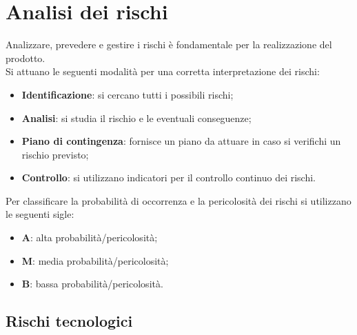 \section{Analisi dei rischi}
Analizzare, prevedere e gestire i rischi è fondamentale per la realizzazione del prodotto. \\
Si attuano le seguenti modalità per una corretta interpretazione dei rischi:
\begin{itemize}
    \item \textbf{Identificazione}: si cercano tutti i possibili rischi;
    \item \textbf{Analisi}: si studia il rischio e le eventuali conseguenze;
    \item \textbf{Piano di contingenza}: fornisce un piano da attuare in caso si verifichi un rischio previsto;
    \item \textbf{Controllo}: si utilizzano indicatori per il controllo continuo dei rischi.
\end{itemize}
\noindent
Per classificare la probabilità di occorrenza e la pericolosità dei rischi si utilizzano le seguenti sigle:
\begin{itemize}
    \item \textbf{A}: alta probabilità/pericolosità;
    \item \textbf{M}: media probabilità/pericolosità;
    \item \textbf{B}: bassa probabilità/pericolosità.
\end{itemize}
\pagebreak
\subsection{Rischi tecnologici}
\renewcommand{\arraystretch}{1.8}

